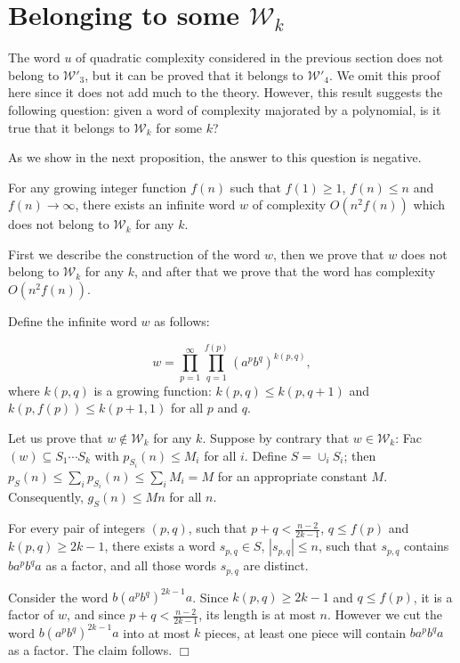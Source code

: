 \documentclass[runningheads,envcountsect,envcountsame]{llncs}
\begin{document}
\section{Belonging to some $\mathcal W_k$}

The word $u$ of quadratic complexity considered in the previous section does not belong to $\mathcal W'_3$, but it can be proved that it belongs to $\mathcal W'_4$. We omit this proof here since it does not add much to the theory. However, this result suggests the following question: given a word of complexity majorated by a polynomial, is it true that it belongs to $\mathcal W_k$ for some $k$?

As we show in the next proposition, the answer to this question is
negative.


\begin{proposition}\label{n2fn} For any growing integer function $f(n)$ such that $f(1)\geq 1$, $f(n)\leq n$ and $f(n)\to \infty$, there exists an infinite
word $w$ of complexity $O(n^2 f(n))$ which does not belong to
$\mathcal W_k$ for any $k$.\end{proposition}

First we describe the construction of the word $w$, then we prove
that $w$ does not belong to $\mathcal W_k$ for any $k$, and after that we prove
that the word has complexity $O(n^2 f(n))$.

\medskip

Define the infinite word $w$ as follows:

$$w=\prod_{p=1}^{\infty} \prod_{q=1}^{f(p)}(a^{p}b^{q})^{k(p,q)},$$
where $k(p,q)$ is a growing function: $k(p,q)\leq k(p,q+1)$ and $k(p,f(p))\leq k(p+1,1)$ for all $p$ and $q$. 


Let us prove that $w\notin \mathcal W_k$ for any $k$. Suppose by contrary
that $w\in \mathcal W_k$: Fac$(w)\subseteq S_1 \cdots S_k$ with $p_{S_i}(n)\leq M_i$ for all $i$. Define $S=\cup_i S_i$; then $p_{S}(n)\leq \sum_i p_{S_i}(n)\leq \sum_i M_i = M$ for an appropriate constant $M$. Consequently, $g_S(n)\leq Mn$ for all $n$.

\begin{claim}\label{c:pq}
For every pair of integers $(p,q)$, such that $p+q<\frac{n-2}{2k-1}$, $q\leq f(p)$ and $k(p,q)\geq 2k-1$, there
exists a word $s_{p,q}\in S$, $|s_{p,q}|\leq n$, such that $s_{p,q}$ contains $ba^p b^q a$
as a factor, and all those words $s_{p,q}$ are distinct.
\end{claim}

 Consider the word $b (a^p b^q)^{2k-1} a$.
Since $k(p,q)\geq 2k-1$ and $q\leq f(p)$, it is a factor of $w$,
and since $p+q<\frac{n-2}{2k-1}$, its length is at most $n$.
However we cut the word $b (a^p b^q)^{2k-1} a$ into at most $k$
pieces, at least one piece will contain $ba^p b^q a$ as a factor.
The claim follows. \hfill $\Box$
\end{document}
